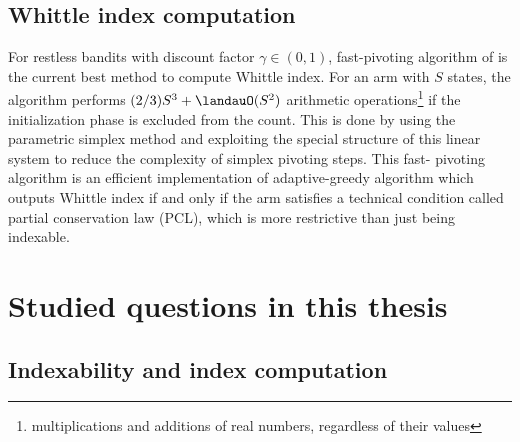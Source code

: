 
\subsection{Whittle index computation}

For restless bandits with discount factor $\gamma\in(0,1)$, fast-pivoting algorithm of \cite{nino2020fast} is the current best method to compute Whittle index.
For an arm with $S$ states, the algorithm performs $(2/3)S^3+\landauO(S^2)$ arithmetic operations\footnote{multiplications and additions of real numbers, regardless of their values} if the initialization phase is excluded from the count.
This is done by using the parametric simplex method and exploiting the special structure of this linear system to reduce the complexity of simplex pivoting steps. This fast- pivoting algorithm is an efficient implementation of adaptive-greedy algorithm \cite{nino2007dynamic} which outputs Whittle index if and only if the arm satisfies a technical condition called partial conservation law (PCL), which is more restrictive than just being indexable.


\section{Studied questions in this thesis}

\subsection{Indexability and index computation}

